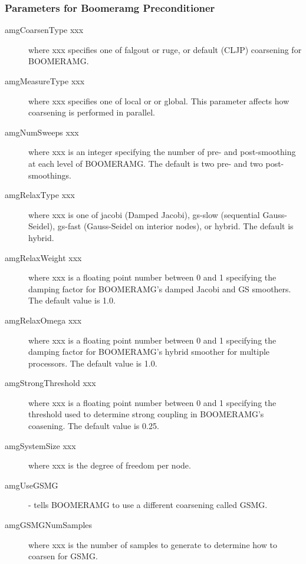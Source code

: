 \subsubsection{Parameters for Boomeramg Preconditioner}
\begin{description}
\item[amgCoarsenType xxx] where xxx specifies one of {\sf falgout} or
           {\sf ruge}, or {\sf default (CLJP)} coarsening for BOOMERAMG.
\item[amgMeasureType xxx] where xxx specifies one of {\sf local} or
           or {\sf global}.  This parameter affects how coarsening is performed
           in parallel.
\item[amgNumSweeps xxx] where xxx is an integer specifying the number of
           pre- and post-smoothing at each level of BOOMERAMG.
           The default is two pre- and two post-smoothings.
\item[amgRelaxType xxx] where xxx is one of {\sf jacobi} (Damped Jacobi),
           {\sf gs-slow} (sequential Gauss-Seidel), {\sf gs-fast}
           (Gauss-Seidel on interior nodes), or {\sf hybrid}.
           The default is {\sf hybrid}.
\item[amgRelaxWeight xxx] where xxx is a floating point number between 
           0 and 1 specifying the damping factor for BOOMERAMG's damped
           Jacobi and GS smoothers.  The default value is 1.0.
\item[amgRelaxOmega xxx] where xxx is a floating point number between 
           0 and 1 specifying the damping factor for BOOMERAMG's hybrid
           smoother for multiple processors.  The default value is 1.0.
\item[amgStrongThreshold xxx] where xxx is a floating point number between 0 
           and 1 specifying the threshold used to determine
           strong coupling in BOOMERAMG's coasening.  The default 
           value is 0.25.
\item[amgSystemSize xxx] where xxx is the degree of freedom per node.
\item[amgUseGSMG] - tells BOOMERAMG to use a different coarsening called GSMG.
\item[amgGSMGNumSamples] where xxx is the number of samples to generate
           to determine how to coarsen for GSMG.
\end{description}

